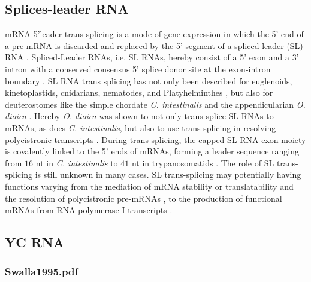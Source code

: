 \documentclass[graybox]{svmult}
\begin{document}
\subsection{Splices-leader RNA}
mRNA 5'leader trans-splicing is a mode of gene expression in which the 5' end 
of a pre-mRNA is discarded and replaced by the 5' segment of a spliced leader 
(SL) RNA \cite{Vandenberghe2001}. Spliced-Leader RNAs, i.e. SL RNAs, hereby 
consist of a 5' exon and a 3' intron with a conserved consensus 5' splice donor 
site at the exon-intron boundary \cite{Ganot2004}. SL RNA trans splicing has 
not only been described for euglenoids, kinetoplastids, cnidarians, nematodes, 
and 
Platyhelminthes \cite{Ganot2004}, but also for deuterostomes like the simple 
chordate \textit{C. intestinalis} \cite{Vandenberghe2001} and the 
appendicularian \textit{O. dioica} \cite{Ganot2004}. Hereby \textit{O. dioica} 
was shown to not only trans-splice SL RNAs to mRNAs, as does \textit{C. 
intestinalis}, but also to use trans splicing in resolving polycistronic 
transcripts \cite{Ganot2004}. During trans splicing, the capped SL RNA exon 
moiety is covalently linked to the 5' ends of mRNAs, forming a leader sequence 
ranging from $16$ nt in \textit{C. intestinalis} to $41$ nt in trypanosomatids 
\cite{Ganot2004}. The role of SL trans-splicing is still unknown in many cases. 
SL trans-splicing may potentially having functions varying from the mediation 
of mRNA stability or translatability \cite{Maroney1995} and the resolution 
of polycistronic pre-mRNAs \cite{Agabian1990, Blumenthal1995}, to the 
production of functional mRNAs from RNA polymerase I 
transcripts \cite{ShuLee1997}.


\subsection{YC RNA}
\subsubsection{Swalla1995.pdf}
\end{document}
